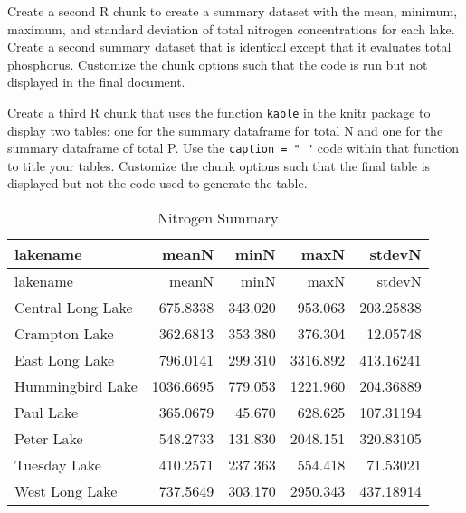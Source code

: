 \documentclass[
]{article}
\newenvironment{Shaded}{\begin{snugshade}}{\end{snugshade}}
\newcommand{\DecValTok}[1]{\textcolor[rgb]{0.00,0.00,0.81}{#1}}
\newcommand{\KeywordTok}[1]{\textcolor[rgb]{0.13,0.29,0.53}{\textbf{#1}}}
\newcommand{\NormalTok}[1]{#1}
\newcommand{\OperatorTok}[1]{\textcolor[rgb]{0.81,0.36,0.00}{\textbf{#1}}}
\newcommand{\StringTok}[1]{\textcolor[rgb]{0.31,0.60,0.02}{#1}}
\begin{document}
\begin{Shaded}
\end{Shaded}

Create a second R chunk to create a summary dataset with the mean,
minimum, maximum, and standard deviation of total nitrogen
concentrations for each lake. Create a second summary dataset that is
identical except that it evaluates total phosphorus. Customize the chunk
options such that the code is run but not displayed in the final
document.

Create a third R chunk that uses the function \texttt{kable} in the
knitr package to display two tables: one for the summary dataframe for
total N and one for the summary dataframe of total P. Use the
\texttt{caption\ =\ "\ "} code within that function to title your
tables. Customize the chunk options such that the final table is
displayed but not the code used to generate the table.

\begin{longtable}[]{@{}lrrrr@{}}
\caption{Nitrogen Summary}\tabularnewline
\toprule
lakename & meanN & minN & maxN & stdevN\tabularnewline
\midrule
\endfirsthead
\toprule
lakename & meanN & minN & maxN & stdevN\tabularnewline
\midrule
\endhead
Central Long Lake & 675.8338 & 343.020 & 953.063 &
203.25838\tabularnewline
Crampton Lake & 362.6813 & 353.380 & 376.304 & 12.05748\tabularnewline
East Long Lake & 796.0141 & 299.310 & 3316.892 &
413.16241\tabularnewline
Hummingbird Lake & 1036.6695 & 779.053 & 1221.960 &
204.36889\tabularnewline
Paul Lake & 365.0679 & 45.670 & 628.625 & 107.31194\tabularnewline
Peter Lake & 548.2733 & 131.830 & 2048.151 & 320.83105\tabularnewline
Tuesday Lake & 410.2571 & 237.363 & 554.418 & 71.53021\tabularnewline
West Long Lake & 737.5649 & 303.170 & 2950.343 &
437.18914\tabularnewline
\bottomrule
\end{longtable}
\end{document}
